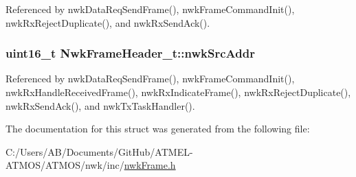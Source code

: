Referenced by nwk\-Data\-Req\-Send\-Frame(), nwk\-Frame\-Command\-Init(), nwk\-Rx\-Reject\-Duplicate(), and nwk\-Rx\-Send\-Ack().

\hypertarget{struct_nwk_frame_header__t_a4e62b8b0c4a47f8fc152f3f5e05db61a}{
\subsubsection[{nwk\-Src\-Addr}]{\setlength{\rightskip}{0pt plus 5cm}uint16\-\_\-t Nwk\-Frame\-Header\-\_\-t\-::nwk\-Src\-Addr}}\label{struct_nwk_frame_header__t_a4e62b8b0c4a47f8fc152f3f5e05db61a}


Referenced by nwk\-Data\-Req\-Send\-Frame(), nwk\-Frame\-Command\-Init(), nwk\-Rx\-Handle\-Received\-Frame(), nwk\-Rx\-Indicate\-Frame(), nwk\-Rx\-Reject\-Duplicate(), nwk\-Rx\-Send\-Ack(), and nwk\-Tx\-Task\-Handler().



The documentation for this struct was generated from the following file\-:\begin{DoxyCompactItemize}
\item 
C\-:/\-Users/\-A\-B/\-Documents/\-Git\-Hub/\-A\-T\-M\-E\-L-\/\-A\-T\-M\-O\-S/\-A\-T\-M\-O\-S/nwk/inc/\hyperlink{nwk_frame_8h}{nwk\-Frame.\-h}\end{DoxyCompactItemize}
